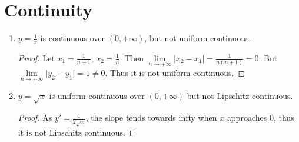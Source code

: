 \documentclass[paper=a4, fontsize=11pt]{scrartcl} %
\numberwithin{equation}{section} %
\numberwithin{figure}{section} %
\numberwithin{table}{section} %
\begin{document}
\section{Continuity}

\begin{enumerate}
\item $y=\frac{1}{x}$ is continuous over $(0, +\infty)$, but not uniform continuous.
      \begin{proof}
      	Let $x_1 = \frac{1}{n+1}$,  $x_2 = \frac{1}{n}$. 
      	Then $\lim\limits_{n \rightarrow +\infty} \vert x_2-x_1 \vert = \frac{1}{n(n+1)} = 0 $.
      	But $\lim\limits_{n \rightarrow +\infty} \vert y_2- y_1 \vert = 1 \neq 0 $.
      	Thus it is not uniform continuous.
      \end{proof}
\item $y=\sqrt{x}$ is uniform continuous over $(0, +\infty)$ but not Lipschitz continuous.
	  \begin{proof}
	  	As $y\prime = \frac{1}{2\sqrt{x}}$, 
	  	the slope tends towards infty when $x$ approaches 0, 
	  	thus it is not Lipschitz continuous.  
	  \end{proof}
\end{enumerate}


\end{document}
